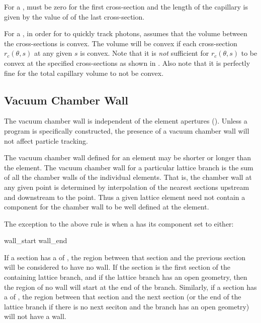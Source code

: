 For a ,  must be zero for the first cross-section and
the length of the capillary is given by the value of  of the
last cross-section.

For a , in order for \bmad to quickly track photons,
\bmad assumes that the volume between the cross-sections is
convex. The volume will be convex if each cross-section $r_c(\theta,
s)$ at any given $s$ is convex. Note that it is {\em not} sufficient
for $r_c(\theta, s)$ to be convex at the specified cross-sections as
shown in . Also note that it is perfectly
fine for the total capillary volume to not be convex.

\subsection{Vacuum Chamber Wall}
\label{s:wall.vacuum}

The vacuum chamber wall is independent of the element apertures
(). Unless a program is specifically constructed, the
presence of a vacuum chamber wall will not affect particle tracking.

The vacuum chamber wall defined for an element may be shorter or
longer than the element.  The vacuum chamber wall for a particular
lattice branch is the sum of all the chamber walls of the individual
elements. That is, the chamber wall at any given point is determined
by interpolation of the nearest sections upstream and downstream to
the point.  Thus a given lattice element need not contain a 
component for the chamber wall to be well defined at the element. 

The exception to the above rule is when a  has its
 component set to either:
\begin{example}
  wall_start
  wall_end
\end{example}
If a section has a  of , the region between
that section and the previous section will be considered to have no
wall. If the  section is the first section of the
containing lattice branch, and if the lattice branch has an open
geometry, then the region of no wall will start at the end of the
branch. Similarly, if a section has a  of , the
region between that section and the next section (or the end of the
lattice branch if there is no next seciton and the branch has an open
geometry) will not have a wall.

